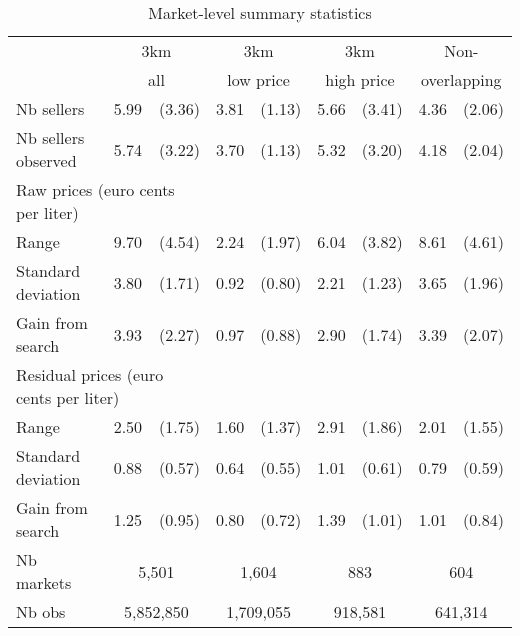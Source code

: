 \documentclass[english]{article}
\begin{document}
\begin{table}[!h]
  \caption{Market-level summary statistics}
\begin{tabular}{lrrrrrrrr}
\hline
\hline
      & \multicolumn{2}{c}{3km}    & \multicolumn{2}{c}{3km}       & \multicolumn{2}{c}{3km}        & \multicolumn{2}{c}{Non-} \\
      & \multicolumn{2}{c}{all}    & \multicolumn{2}{c}{low price} & \multicolumn{2}{c}{high price} & \multicolumn{2}{c}{overlapping} \\
\hline
Nb sellers & 5.99  & (3.36) & 3.81  & (1.13) & 5.66  & (3.41) & 4.36  & (2.06) \\
Nb sellers observed & 5.74  & (3.22) & 3.70  & (1.13) & 5.32  & (3.20) & 4.18  & (2.04) \\
\hline
\multicolumn{3}{l}{Raw prices (euro cents per liter)}          &       &       &       &       &       &  \\
Range & 9.70  & (4.54) & 2.24  & (1.97) & 6.04  & (3.82) & 8.61  & (4.61) \\
Standard deviation & 3.80  & (1.71) & 0.92  & (0.80) & 2.21  & (1.23) & 3.65  & (1.96) \\
Gain from search & 3.93  & (2.27) & 0.97  & (0.88) & 2.90  & (1.74) & 3.39  & (2.07) \\
\hline
\multicolumn{3}{l}{Residual prices (euro cents per liter)}      &       &       &       &       &       &  \\
Range & 2.50  & (1.75) & 1.60  & (1.37) & 2.91  & (1.86) & 2.01  & (1.55) \\
Standard deviation & 0.88  & (0.57) & 0.64  & (0.55) & 1.01  & (0.61) & 0.79  & (0.59) \\
Gain from search & 1.25  & (0.95) & 0.80  & (0.72) & 1.39  & (1.01) & 1.01  & (0.84) \\
\hline
Nb markets & \multicolumn{2}{c}{5,501} & \multicolumn{2}{c}{1,604} & \multicolumn{2}{c}{883} & \multicolumn{2}{c}{604} \\
Nb obs     & \multicolumn{2}{c}{5,852,850} & \multicolumn{2}{c}{1,709,055} & \multicolumn{2}{c}{918,581} & \multicolumn{2}{c}{641,314} \\
\hline
\hline
\end{tabular}
\label{tab:stats_des_markets}
\end{table}
\end{document}
